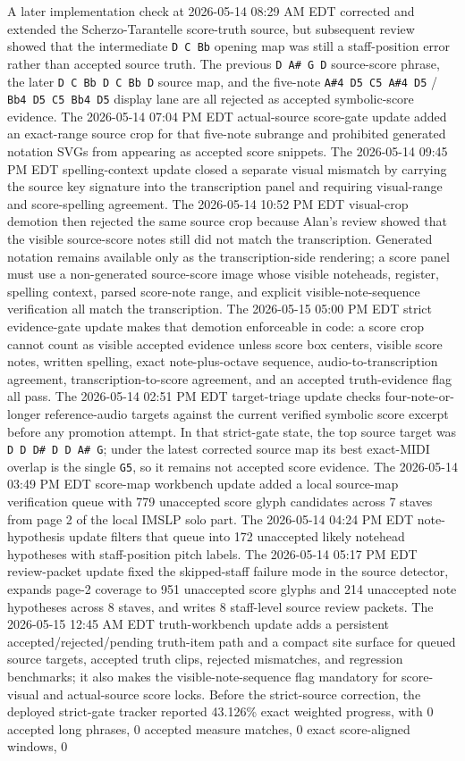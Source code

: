 \documentclass[12pt,letterpaper]{article}
\begin{document}
A later implementation check at 2026-05-14 08:29 AM EDT corrected and extended the Scherzo-Tarantelle score-truth source, but subsequent review showed that the intermediate \texttt{D C Bb} opening map was still a staff-position error rather than accepted source truth. The previous \texttt{D A\# G D} source-score phrase, the later \texttt{D C Bb D C Bb D} source map, and the five-note \texttt{A\#4 D5 C5 A\#4 D5} / \texttt{Bb4 D5 C5 Bb4 D5} display lane are all rejected as accepted symbolic-score evidence. The 2026-05-14 07:04 PM EDT actual-source score-gate update added an exact-range source crop for that five-note subrange and prohibited generated notation SVGs from appearing as accepted score snippets. The 2026-05-14 09:45 PM EDT spelling-context update closed a separate visual mismatch by carrying the source key signature into the transcription panel and requiring visual-range and score-spelling agreement. The 2026-05-14 10:52 PM EDT visual-crop demotion then rejected the same source crop because Alan's review showed that the visible source-score notes still did not match the transcription. Generated notation remains available only as the transcription-side rendering; a score panel must use a non-generated source-score image whose visible noteheads, register, spelling context, parsed score-note range, and explicit visible-note-sequence verification all match the transcription. The 2026-05-15 05:00 PM EDT strict evidence-gate update makes that demotion enforceable in code: a score crop cannot count as visible accepted evidence unless score box centers, visible score notes, written spelling, exact note-plus-octave sequence, audio-to-transcription agreement, transcription-to-score agreement, and an accepted truth-evidence flag all pass. The 2026-05-14 02:51 PM EDT target-triage update checks four-note-or-longer reference-audio targets against the current verified symbolic score excerpt before any promotion attempt. In that strict-gate state, the top source target was \texttt{D D D\# D D A\# G}; under the latest corrected source map its best exact-MIDI overlap is the single \texttt{G5}, so it remains not accepted score evidence. The 2026-05-14 03:49 PM EDT score-map workbench update added a local source-map verification queue with 779 unaccepted score glyph candidates across 7 staves from page 2 of the local IMSLP solo part. The 2026-05-14 04:24 PM EDT note-hypothesis update filters that queue into 172 unaccepted likely notehead hypotheses with staff-position pitch labels. The 2026-05-14 05:17 PM EDT review-packet update fixed the skipped-staff failure mode in the source detector, expands page-2 coverage to 951 unaccepted score glyphs and 214 unaccepted note hypotheses across 8 staves, and writes 8 staff-level source review packets. The 2026-05-15 12:45 AM EDT truth-workbench update adds a persistent accepted/rejected/pending truth-item path and a compact site surface for queued source targets, accepted truth clips, rejected mismatches, and regression benchmarks; it also makes the visible-note-sequence flag mandatory for score-visual and actual-source score locks. Before the strict-source correction, the deployed strict-gate tracker reported 43.126\% exact weighted progress, with 0 accepted long phrases, 0 accepted measure matches, 0 exact score-aligned windows, 0 
\end{document}

